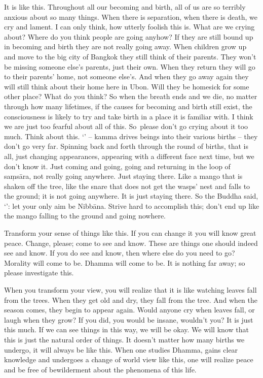 It is like this. Throughout all our becoming and birth, all of us are so terribly anxious about so many things. When there is separation, when there is death, we cry and lament. I can only think, how utterly foolish this is. What are we crying about? Where do you think people are going anyhow? If they are still bound up in becoming and birth they are not really going away. When children grow up and move to the big city of Bangkok they still think of their parents. They won't be missing someone else's parents, just their own. When they return they will go to their parents' home, not someone else's. And when they go away again they will still think about their home here in Ubon. Will they be homesick for some other place? What do you think? So when the breath ends and we die, no matter through how many lifetimes, if the causes for becoming and birth still exist, the consciousness is likely to try and take birth in a place it is familiar with. I think we are just too fearful about all of this. \mbox{So please} don't go crying about it too much. Think about this. `' -- kamma drives beings into their various births -- they don't go very far. Spinning back and forth through the round of births, that is all, just changing appearances, appearing with a different face next time, but we don't know it. Just coming and going, going and returning in the loop of sa\d{m}s\=ara, not really going anywhere. Just staying there. Like a mango that is shaken off the tree, like the snare that does not get the wasps' nest and falls to the ground; it is not going anywhere. It is just staying there. So the Buddha said, `': let your only aim be Nibb\=ana. Strive hard to accomplish this; don't end up like the mango falling to the ground and going nowhere.

Transform your sense of things like this. If you can change it you will know great peace. Change, please; come to see and know. These are things one should indeed see and know. If you do see and know, then where else do you need to go? Morality will come to be. Dhamma will come to be. It is nothing far away; so please investigate this.

When you transform your view, you will realize that it is like watching leaves fall from the trees. When they get old and dry, they fall from the tree. And when the season comes, they begin to appear again. Would anyone cry when leaves fall, or laugh when they grow? If you did, you would be insane, wouldn't you? It is just this much. If we can see things in this way, we will be okay. We will know that this is just the natural order of things. It doesn't matter how many births we undergo, it will always be like this. When one studies Dhamma, gains clear knowledge and undergoes a change of world view like this, one will realize peace and be free of bewilderment about the phenomena of this life.

